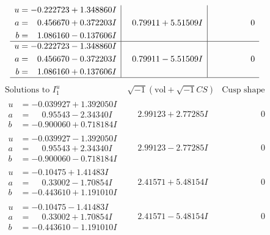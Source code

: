 \documentclass[1p]{elsarticle_modified}
\theoremstyle{definition}
\newcommand{\I}{\sqrt{-1}}
\begin{document}
$$\begin{array}{c|c|c}
\begin{aligned}
u &= -0.222723 + 1.348860 I \\
a &= \phantom{-}0.456670 + 0.372203 I \\
b &= \phantom{-}1.086160 - 0.137606 I\end{aligned}
 & \phantom{-}0.79911 + 5.51509 I & \phantom{-0.000000 } 0 \\ \hline\begin{aligned}
u &= -0.222723 - 1.348860 I \\
a &= \phantom{-}0.456670 - 0.372203 I \\
b &= \phantom{-}1.086160 + 0.137606 I\end{aligned}
 & \phantom{-}0.79911 - 5.51509 I & \phantom{-0.000000 } 0\\
 \hline 
 \end{array}$$\newpage$$\begin{array}{c|c|c}  
\text{Solutions to }I^u_{1}& \I (\text{vol} + \sqrt{-1}CS) & \text{Cusp shape}\\
 \hline 
\begin{aligned}
u &= -0.039927 + 1.392050 I \\
a &= \phantom{-}0.95543 - 2.34340 I \\
b &= -0.900060 + 0.718184 I\end{aligned}
 & \phantom{-}2.99123 + 2.77285 I & \phantom{-0.000000 } 0 \\ \hline\begin{aligned}
u &= -0.039927 - 1.392050 I \\
a &= \phantom{-}0.95543 + 2.34340 I \\
b &= -0.900060 - 0.718184 I\end{aligned}
 & \phantom{-}2.99123 - 2.77285 I & \phantom{-0.000000 } 0 \\ \hline\begin{aligned}
u &= -0.10475 + 1.41483 I \\
a &= \phantom{-}0.33002 - 1.70854 I \\
b &= -0.443610 + 1.191010 I\end{aligned}
 & \phantom{-}2.41571 + 5.48154 I & \phantom{-0.000000 } 0 \\ \hline\begin{aligned}
u &= -0.10475 - 1.41483 I \\
a &= \phantom{-}0.33002 + 1.70854 I \\
b &= -0.443610 - 1.191010 I\end{aligned}
 & \phantom{-}2.41571 - 5.48154 I & \phantom{-0.000000 } 0 \\ \hline\begin{aligned}

\end{aligned}
\end{array}$$
\end{document}
